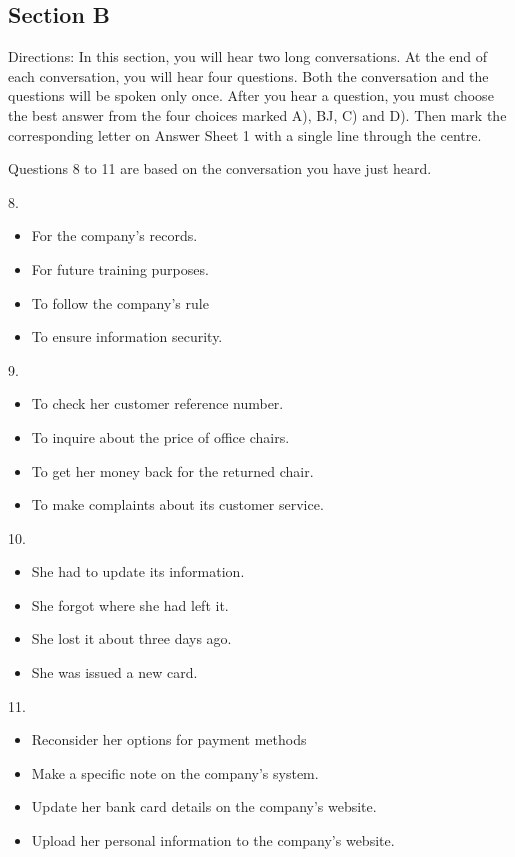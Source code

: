 \documentclass[UTF8,11pt]{ctexart}
\begin{document}
\subsection*{Section B}


Directions: In this section, you will hear two long conversations. At the end of each conversation, you will hear four questions. Both the conversation and the questions will be spoken only once. After you hear a question, you must choose the best answer from the four choices marked A), BJ, C) and D). Then mark the corresponding letter on Answer Sheet 1 with a single line through the centre.


Questions 8 to 11 are based on the conversation you have just heard.


8.


\begin{itemize}[leftmargin=2em,itemsep=.2em,topsep=.4em]\item[A.] For the company's records.
\item[B.] For future training purposes.
\item[C.] To follow the company's rule
\item[D.] To ensure information security.
\end{itemize}

9.


\begin{itemize}[leftmargin=2em,itemsep=.2em,topsep=.4em]\item[A.] To check her customer reference number.
\item[B.] To inquire about the price of office chairs.
\item[C.] To get her money back for the returned chair.
\item[D.] To make complaints about its customer service.
\end{itemize}

10.


\begin{itemize}[leftmargin=2em,itemsep=.2em,topsep=.4em]\item[A.] She had to update its information.
\item[B.] She forgot where she had left it.
\item[C.] She lost it about three days ago.
\item[D.] She was issued a new card.
\end{itemize}

11.


\begin{itemize}[leftmargin=2em,itemsep=.2em,topsep=.4em]\item[A.] Reconsider her options for payment methods
\item[B.] Make a specific note on the company's system.
\item[C.] Update her bank card details on the company's website.
\item[D.] Upload her personal information to the company's website.
\end{itemize}
\end{document}
